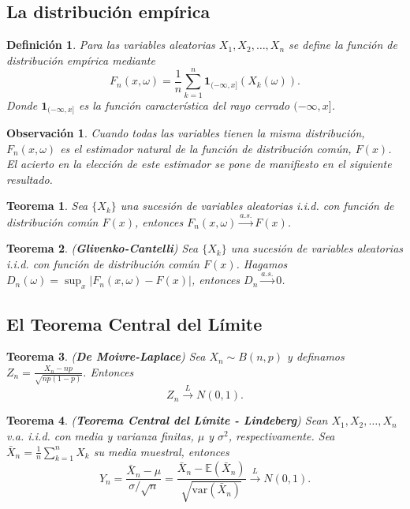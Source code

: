 \documentclass{report}
\newtheorem{thm}{Teorema}[section]
\newtheorem{dfn}{Definición}[section]
\newtheorem{obs}{Observación}[section]
\begin{document}
\subsection{La distribución empírica}

\begin{dfn}
    Para las variables aleatorias $X_1, X_2, \dots, X_n$ se define la función de distribución empírica mediante
    \[
        F_n(x, \omega) = \frac{1}{n} \sum_{k=1}^n \mathbf{1}_{(-\infty,x]}(X_k(\omega)).
        \]
    Donde $ \mathbf{1}_{(-\infty,x]}$ es la función característica del rayo cerrado $(-\infty,x]$.
\end{dfn}

\begin{obs}
    Cuando todas las variables tienen la misma distribución, $F_n(x,\omega)$ es el estimador natural de la función de distribución común, $F(x)$. 
    El acierto en la elección de este estimador se pone de manifiesto en el siguiente resultado.
\end{obs}

\begin{thm} \label{thm:empirical_fn_convergence}
Sea $\{X_k\}$ una sucesión de variables aleatorias i.i.d. con función de distribución común $F(x)$, entonces $F_n(x,\omega) \xrightarrow{a.s.} F(x)$.
\end{thm}


\begin{thm} \label{thm:glivenko_cantelli} (\textbf{Glivenko-Cantelli}) Sea $\{X_k\}$ una sucesión de variables aleatorias i.i.d. con función de distribución común $F(x)$. Hagamos $D_n(\omega) = \sup_x |F_n(x,\omega) - F(x)|$, entonces $D_n \xrightarrow{a.s.} 0$.
\end{thm}

\subsection{El Teorema Central del Límite}

\begin{thm} \label{thm:de_moivre_laplace} (\textbf{De Moivre-Laplace}) Sea $X_n \sim B(n,p)$ y definamos $Z_n = \frac{X_n - np}{\sqrt{np(1-p)}}$. Entonces
\[
Z_n \xrightarrow{L} N(0,1).
\]
\end{thm}

\begin{thm} \label{thm:lindeberg} (\textbf{Teorema Central del Límite - Lindeberg}) Sean $X_1, X_2, \dots, X_n$ v.a. i.i.d. con media y varianza finitas, $\mu$ y $\sigma^2$, respectivamente. Sea $\bar{X}_n = \frac{1}{n} \sum_{k=1}^n X_k$ su media muestral, entonces
\[
Y_n = \frac{\bar{X}_n - \mu}{\sigma/\sqrt{n}} = \frac{\bar{X}_n - \mathbb{E}(\bar{X}_n)}{\sqrt{\mathrm{var}(\bar{X}_n)}} \xrightarrow{L} N(0,1).
\]
\end{thm}
\end{document}
